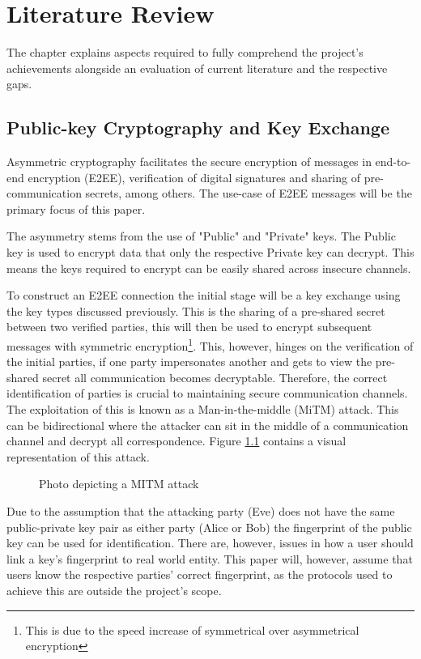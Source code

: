 \chapter{Literature Review}
\label{cha:LiteratureReview}

The chapter explains aspects required to fully comprehend the project's achievements alongside an evaluation of current literature and the respective gaps.

\section{Public-key Cryptography and Key Exchange}
Asymmetric cryptography facilitates the secure encryption of messages in end-to-end encryption (E2EE), verification of digital signatures and sharing of pre-communication secrets, among others. The use-case of E2EE messages will be the primary focus of this paper.

The asymmetry stems from the use of "Public" and "Private" keys. The Public key is used to encrypt data that only the respective Private key can decrypt. This means the keys required to encrypt can be easily shared across insecure channels.

To construct an E2EE connection the initial stage will be a key exchange using the key types discussed previously. This is the sharing of a pre-shared secret between two verified parties, this will then be used to encrypt subsequent messages with symmetric encryption\footnote{This is due to the speed increase of symmetrical over asymmetrical encryption}. This, however, hinges on the verification of the initial parties, if one party impersonates another and gets to view the pre-shared secret all communication becomes decryptable. Therefore, the correct identification of parties is crucial to maintaining secure communication channels. The exploitation of this is known as a Man-in-the-middle (MiTM) attack. This can be bidirectional where the attacker can sit in the middle of a communication channel and decrypt all correspondence. Figure \ref{fig:mitm} contains a visual representation of this attack.

\begin{center}
    
    \begin{figure}[h]
        \caption{Photo depicting a MITM attack}
        \label{fig:mitm}
    \end{figure}
\end{center}

Due to the assumption that the attacking party (Eve) does not have the same public-private key pair as either party (Alice or Bob) the fingerprint of the public key can be used for identification. There are, however, issues in how a user should link a key's fingerprint to real world entity. This paper will, however, assume that users know the respective parties' correct fingerprint, as the protocols used to achieve this are outside the project's scope.

